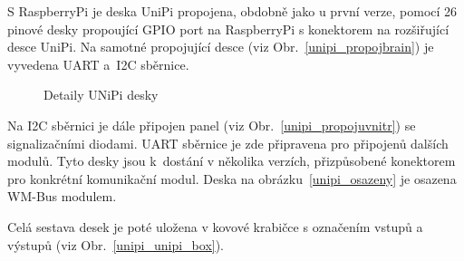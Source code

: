 \newpage

S RaspberryPi je deska UniPi propojena, obdobně jako u první verze, pomocí 26 pinové desky propoující GPIO port na RaspberryPi s konektorem na rozšiřující desce UniPi. Na samotné propojující desce (viz Obr.~\ref{unipi_propojbrain}) je vyvedena UART a~I2C sběrnice. 

\begin{figure}[!ht]
		\vspace{-10pt}
    \centering
			\hspace*{5mm}
			\caption{Detaily UNiPi desky}
			\vspace{-5pt}
\end{figure}

Na I2C sběrnici je dále připojen panel (viz Obr.~\ref{unipi_propojuvnitr}) se signalizačními diodami. UART sběrnice je zde připravena pro připojenů dalších modulů. Tyto desky jsou k~dostání v několika verzích, přizpůsobené konektorem pro konkrétní komunikační modul. Deska na obrázku~\ref{unipi_osazeny} je osazena WM-Bus modulem.
 
Celá sestava desek je poté uložena v kovové krabičce s označením vstupů a výstupů (viz Obr.~\ref{unipi_unipi_box}).


